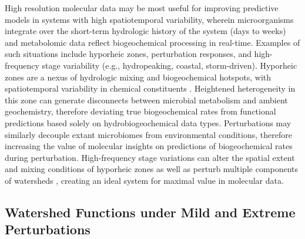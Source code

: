 \documentclass[preprint,review, 12pt]{elsarticle}
\begin{document}
High resolution molecular data may be most useful for improving predictive models in systems with high spatiotemporal variability, wherein microorganisms integrate over the short-term hydrologic history of the system (days to weeks) and metabolomic data reflect biogeochemical processing in real-time. Examples of such situations include hyporheic zones, perturbation responses, and high-frequency stage variability (e.g., hydropeaking, coastal, storm-driven). Hyporheic zones are a nexus of hydrologic mixing and biogeochemical hotspots, with spatiotemporal variability in chemical constituents \citep{Boulton1998, McClain2003, Harvey2015b}. Heightened heterogeneity in this zone can generate disconnects between microbial metabolism and ambient geochemistry, therefore deviating true biogeochemical rates from functional predictions based solely on hydrobiogeochemical data types. Perturbations may similarly decouple extant microbiomes from environmental conditions, therefore increasing the value of molecular insights on predictions of biogeochemical rates during perturbation. High-frequency stage variations can alter the spatial extent and mixing conditions of hyporheic zones as well as perturb multiple components of watersheds \citep{Song2018b,Shuai2019b}, creating an ideal system for maximal value in molecular data. 

\subsection{Watershed Functions under Mild and Extreme Perturbations }
        
\end{document}
